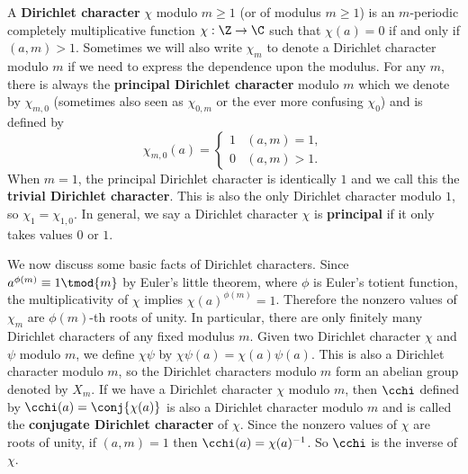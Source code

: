      A \textbf{Dirichlet character} $\chi$ modulo $m \ge 1$ (or of modulus $m \ge 1$) is an $m$-periodic completely multiplicative function $\chi:\Z \to \C$ such that $\chi(a) = 0$ if and only if $(a,m) > 1$. Sometimes we will also write $\chi_{m}$ to denote a Dirichlet character modulo $m$ if we need to express the dependence upon the modulus. For any $m$, there is always the \textbf{principal Dirichlet character} modulo $m$ which we denote by $\chi_{m,0}$ (sometimes also seen as $\chi_{0,m}$ or the ever more confusing $\chi_{0}$) and is defined by
      \[
        \chi_{m,0}(a) = \begin{cases} 1 & (a,m) = 1, \\ 0 & (a,m) > 1. \end{cases}
      \]
      When $m = 1$, the principal Dirichlet character is identically $1$ and we call this the \textbf{trivial Dirichlet character}. This is also the only Dirichlet character modulo $1$, so $\chi_{1} = \chi_{1,0}$. In general, we say a Dirichlet character $\chi$ is \textbf{principal} if it only takes values $0$ or $1$.

      We now discuss some basic facts of Dirichlet characters. Since $a^{\phi(m)} \equiv 1 \tmod{m}$  by Euler's little theorem, where $\phi$ is Euler's totient function, the multiplicativity of $\chi$ implies $\chi(a)^{\phi(m)} = 1$. Therefore the nonzero values of $\chi_{m}$ are $\phi(m)$-th roots of unity. In particular, there are only finitely many Dirichlet characters of any fixed modulus $m$. Given two Dirichlet character $\chi$ and $\psi$ modulo $m$, we define $\chi\psi$ by $\chi\psi(a) = \chi(a)\psi(a)$. This is also a Dirichlet character modulo $m$, so the Dirichlet characters modulo $m$ form an abelian group denoted by $X_{m}$. If we have a Dirichlet character $\chi$ modulo $m$, then $\cchi$ defined by $\cchi(a) = \conj{\chi(a)}$ is also a Dirichlet character modulo $m$ and is called the \textbf{conjugate Dirichlet character} of $\chi$. Since the nonzero values of $\chi$ are roots of unity, if $(a,m) = 1$ then $\cchi(a) = \chi(a)^{-1}$. So $\cchi$ is the inverse of $\chi$.

